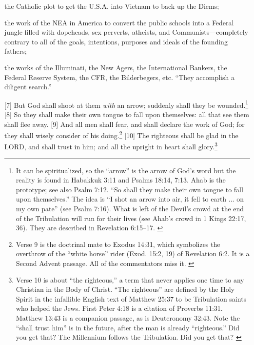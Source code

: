 {\begin{compactenum}
\item  the Catholic plot to get the U.S.A. into Vietnam to back up the Diems; 
\item  the work of the NEA in America to convert the public schools into a Federal jungle filled with dopeheads, sex perverts, atheists, and Communists—completely contrary to all of the goals, intentions, purposes and ideals of the founding fathers; 
\item  the works of the Illuminati, the New Agers, the International Bankers, the Federal Reserve System, the CFR, the Bilderbegers, etc. “They accomplish a diligent search.” 
\end{compactenum} }
[7] \textcolor[rgb]{0.00,0.00,1.00}{But God shall shoot at them \emph{with} an arrow; suddenly shall they be wounded.}\footnote{It can be spiritualized, so the ``arrow'' is the arrow of God’s word but the reality is found in Habakkuk 3:11 and Psalms 18:14, 7:13. Ahab is the prototype; see also Psalm 7:12. ``So shall they make their own tongue  to fall upon themselves.''  The idea is ``I shot an arrow into air, it fell to earth $\hdots$ on my own pate'' (see Psalm 7:16). What is left of the Devil's crowd at the end of the Tribulation will run for their lives (see Ahab's crowd in 1 Kings 22:17, 36). They are described in Revelation 6:15--17. \cite{Ruckman1992Psalms}} 
[8] \textcolor[rgb]{0.00,0.00,1.00}{So they shall make their own tongue to fall upon themselves: all that see them shall flee away.}
[9] \textcolor[rgb]{0.00,0.00,1.00}{And all men shall fear, and shall declare the work of God; for they shall wisely consider of his doing.}\footnote{Verse 9 is the doctrinal mate to Exodus 14:31, which symbolizes the overthrow of the “white horse” rider (Exod. 15:2, 19) of Revelation 6:2. It is a Second Advent passage. All of the commentators miss it. \cite{Ruckman1992Psalms}}
[10] \textcolor[rgb]{0.00,0.00,1.00}{The righteous shall be glad in the LORD, and shall trust in him; and all the upright in heart shall glory.}\footnote{Verse 10 is about “the righteous,” a term that never applies one time to any Christian in the Body of Christ. “The righteous” are defined by the Holy Spirit in the infallible English text of Matthew 25:37 to be Tribulation saints who helped the Jews.  First Peter 4:18 is a citation of Proverbs 11:31. Matthew 13:43 is a companion passage, as is Deuteronomy 32:43. Note the ``shall trust him'' is in the future, after the man is already ``righteous.'' Did you get that? The Millennium follows the Tribulation. Did you get that? \cite{Ruckman1992Psalms}}
